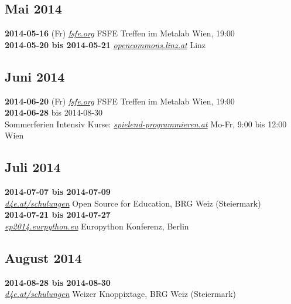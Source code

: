 \subsection*{Mai 2014}
\textbf{2014-05-16} (Fr) \href{http://fsfe.org}{\textit{fsfe.org}} FSFE Treffen im Metalab Wien, 19:00\\
\textbf{2014-05-20 bis 2014-05-21} \href{http://www.opencommons.linz.at/}{\textit{opencommons.linz.at}} Linz\\
\subsection*{Juni 2014}
\textbf{2014-06-20} (Fr) \href{http://fsfe.org}{\textit{fsfe.org}} FSFE Treffen im Metalab Wien, 19:00\\
\textbf{2014-06-28} bis 2014-08-30\\ Sommerferien Intensiv Kurse: \href{http://spielend-programmieren.at}{\textit{spielend-programmieren.at}} Mo-Fr, 9:00 bis 12:00 Wien\\
\subsection*{Juli 2014}
\textbf{2014-07-07 bis 2014-07-09}\\ \href{http://d4e.at/schulungen/}{\textit{d4e.at/schulungen}} Open Source for Education, BRG Weiz (Steiermark)\\
\textbf{2014-07-21 bis 2014-07-27}\\ \href{https://ep2014.europython.eu/en/}{\textit{ep2014.eurpython.eu}} Europython Konferenz, Berlin\\
\subsection*{August 2014}
\textbf{2014-08-28 bis 2014-08-30}\\ \href{http://d4e.at/schulungen/}{\textit{d4e.at/schulungen}} Weizer Knoppixtage, BRG Weiz (Steiermark)\\
